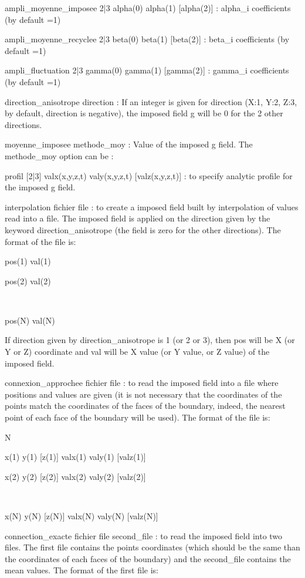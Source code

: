 ampli\_moyenne\_imposee 2|3 alpha(0) alpha(1) [alpha(2)] : alpha\_i coefficients (by default =1)

ampli\_moyenne\_recyclee 2|3 beta(0) beta(1) [beta(2)] : beta\_i coefficients (by default =1)

ampli\_fluctuation 2|3 gamma(0) gamma(1) [gamma(2)] : gamma\_i coefficients (by default =1)



direction\_anisotrope direction : If an integer is given for direction (X:1, Y:2, Z:3, by default, direction is negative), the imposed field g will be 0 for the 2 other directions.



moyenne\_imposee methode\_moy : Value of the imposed g field. The methode\_moy option can be :

profil [2|3] valx(x,y,z,t) valy(x,y,z,t) [valz(x,y,z,t)] : to specify analytic profile for the imposed g field. 

interpolation fichier file : to create a imposed field built by interpolation of values read into a file. The imposed field is applied on the direction given by the keyword direction\_anisotrope (the field is zero for the other directions). The format of the file is:

	pos(1) val(1)

pos(2) val(2)

~

pos(N) val(N)

If direction given by direction\_anisotrope is 1 (or 2 or 3), then pos will be X (or Y or Z) coordinate and val will be X value (or Y value, or Z value) of the imposed field.



connexion\_approchee fichier file : to read the imposed field into a file where positions and values are given (it is not necessary that the coordinates of the points match the coordinates of the faces of the boundary, indeed, the nearest point of each face of the boundary will be used). The format of the file is:

	N

	x(1) y(1) [z(1)] valx(1) valy(1) [valz(1)]

x(2) y(2) [z(2)] valx(2) valy(2) [valz(2)]

~

x(N) y(N) [z(N)] valx(N) valy(N) [valz(N)]

	

connection\_exacte fichier file second\_file : to read the imposed field into two files. The first file contains the points coordinates (which should be the same than the coordinates of each faces of the boundary) and the second\_file contains the mean values. The format of the first file is:

